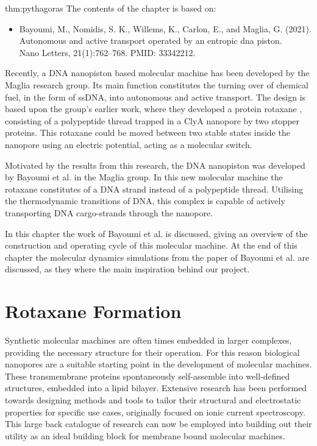 
\begin{theo}{thm:pythagoras}
  The contents of the chapter is based on:
  \vspace{-0.4cm}
  \begin{itemize}
    \item Bayoumi, M., Nomidis, S. K., Willems, K., Carlon, E., and Maglia, G. (2021).
      Autonomous and active transport operated by an entropic dna piston.\\
      Nano Letters, 21(1):762–768. PMID: 33342212.
  \end{itemize}
  \vspace{0.3cm}
\end{theo}

Recently, a DNA nanopiston based molecular machine has been developed by the Maglia
research group. Its main function constitutes the turning over of chemical fuel, in the
form of ssDNA, into autonomous and active transport. The design is based upon the group's
earlier work, where they developed a protein rotaxane \cite{Biesemans2015}, consisting of
a polypeptide thread trapped in
a ClyA nanopore by two stopper proteins. This rotaxane could be moved between two stable
states inside the nanopore using an electric potential, acting as a molecular switch.

Motivated by the results from this research, the DNA nanopiston was developed by Bayoumi
et al. in the Maglia group. In this new molecular machine the rotaxane constitutes of
a DNA strand instead of a polypeptide thread. Utilising the thermodynamic transitions of
DNA, this complex is capable of actively transporting DNA cargo-strands through the
nanopore.

In this chapter the work of Bayoumi et al. is discussed, giving an overview of the
construction and operating cycle of this molecular machine.  At the end of this chapter
the molecular dynamics simulations from the paper of Bayoumi et al. are discussed, as
they where the main inspiration behind our project.

\section{Rotaxane Formation}


Synthetic molecular machines are often times embedded in larger complexes, providing the
necessary structure for their operation. For this reason biological nanopores are a
suitable starting point in the development of molecular machines. These transmembrane
proteins spontaneously self-assemble into well-defined structures, embedded into a lipid
bilayer. Extensive research has been performed towards designing methods and tools to
tailor their structural and electrostatic properties for specific use cases, originally
focused on ionic current spectroscopy. This large back catalogue of research can now be
employed into building out their utility as an ideal building block for membrane bound
molecular machines.

